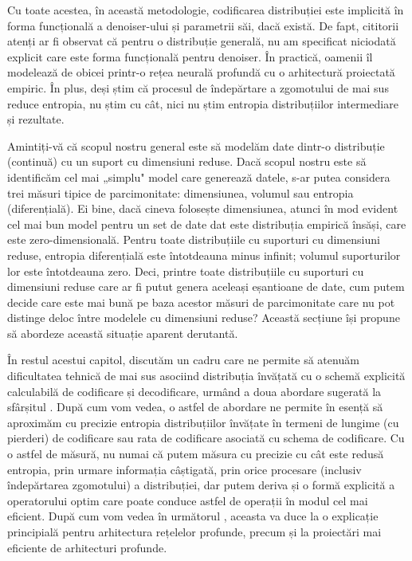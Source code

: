\documentclass[../../book-main_ro.tex]{subfiles}
\begin{document}
Cu toate acestea, în această metodologie, codificarea distribuției este implicită în forma funcțională a denoiser-ului și parametrii săi, dacă există. De fapt, cititorii atenți ar fi observat că pentru o distribuție generală, nu am specificat niciodată explicit care este forma funcțională pentru denoiser. În practică, oamenii îl modelează de obicei printr-o rețea neurală profundă cu o arhitectură proiectată empiric. În plus, deși știm că procesul de îndepărtare a zgomotului de mai sus reduce entropia, nu știm cu cât, nici nu știm entropia distribuțiilor intermediare și rezultate.

Amintiți-vă că scopul nostru general este să modelăm date dintr-o distribuție (continuă) cu un suport cu dimensiuni reduse. Dacă scopul nostru este să identificăm cel mai „simplu" model care generează datele, s-ar putea considera trei măsuri tipice de parcimonitate: dimensiunea, volumul sau entropia (diferențială). Ei bine, dacă cineva folosește dimensiunea, atunci în mod evident cel mai bun model pentru un set de date dat este distribuția empirică însăși, care este zero-dimensională. Pentru toate distribuțiile cu suporturi cu dimensiuni reduse, entropia diferențială este întotdeauna minus infinit; volumul suporturilor lor este întotdeauna zero. Deci, printre toate distribuțiile cu suporturi cu dimensiuni reduse care ar fi putut genera aceleași eșantioane de date, cum putem decide care este mai bună pe baza acestor măsuri de parcimonitate care nu pot distinge deloc între modelele cu dimensiuni reduse? Această secțiune își propune să abordeze această situație aparent derutantă.

În restul acestui capitol, discutăm un cadru care ne permite să atenuăm dificultatea tehnică de mai sus asociind distribuția învățată cu o schemă explicită calculabilă de codificare și decodificare, urmând a doua abordare sugerată la sfârșitul . După cum vom vedea, o astfel de abordare ne permite în esență să aproximăm cu precizie entropia distribuțiilor învățate în termeni de lungime (cu pierderi) de codificare sau rata de codificare asociată cu schema de codificare. Cu o astfel de măsură, nu numai că putem măsura cu precizie cu cât este redusă entropia, prin urmare informația câștigată, prin orice procesare (inclusiv îndepărtarea zgomotului) a distribuției, dar putem deriva și o formă explicită a operatorului optim care poate conduce astfel de operații în modul cel mai eficient. După cum vom vedea în următorul , aceasta va duce la o explicație principială pentru arhitectura rețelelor profunde, precum și la proiectări mai eficiente de arhitecturi profunde.
\end{document}

